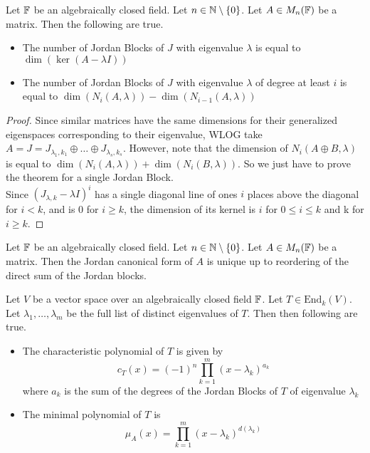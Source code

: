 \documentclass[a4paper]{article}
\begin{document}
\begin{prp}{}{} Let $\mathbb{F}$ be an algebraically closed field. Let $n\in\mathbb{N}\setminus\{0\}$. Let $A\in M_n(\mathbb{F})$ be a matrix. Then the following are true. 
\begin{itemize}
\item The number of Jordan Blocks of $J$ with eigenvalue $\lambda$ is equal to $\dim(\ker(A-\lambda I))$
\item The number of Jordan Blocks of $J$ with eigenvalue $\lambda$ of degree at least $i$ is equal to $\dim(N_i(A,\lambda))-\dim(N_{i-1}(A,\lambda))$
\end{itemize}\begin{proof} Since similar matrices have the same dimensions for their generalized eigenspaces corresponding to their eigenvalue, WLOG take $A=J=J_{\lambda_1,k_1}\oplus\dots\oplus J_{\lambda_s,k_s}$. However, note that the dimension of $N_i(A\oplus B,\lambda)$ is equal to $\dim(N_i(A,\lambda))+\dim(N_i(B,\lambda))$. So we just have to  prove the theorem for a single Jordan Block. \\
Since $(J_{\lambda,k}-\lambda I)^i$ has a single diagonal line of ones $i$ places above the diagonal for $i<k$, and is $0$ for $i\geq k$, the dimension of its kernel is $i$ for $0\leq i\leq k$ and k for $i\geq k$. 
\end{proof}
\end{prp}

\begin{prp}{}{} Let $\mathbb{F}$ be an algebraically closed field. Let $n\in\mathbb{N}\setminus\{0\}$. Let $A\in M_n(\mathbb{F})$ be a matrix. Then the Jordan canonical form of $A$ is unique up to reordering of the direct sum of the Jordan blocks. 
\end{prp}

\begin{prp}{}{} Let $V$ be a vector space over an algebraically closed field $\mathbb{F}$. Let $T\in\text{End}_k(V)$. Let $\lambda_1,\dots,\lambda_m$ be the full list of distinct eigenvalues of $T$. Then then following are true. 
\begin{itemize}
\item The characteristic polynomial of $T$ is given by $$c_T(x)=(-1)^n\prod_{k=1}^m(x-\lambda_k)^{a_k}$$ where $a_k$ is the sum of the degrees of the Jordan Blocks of $T$ of eigenvalue $\lambda_k$
\item The minimal polynomial of $T$ is $$\mu_A(x)=\prod_{k=1}^m(x-\lambda_k)^{d(\lambda_k)}$$
\end{itemize}
\end{prp}
\end{document}
